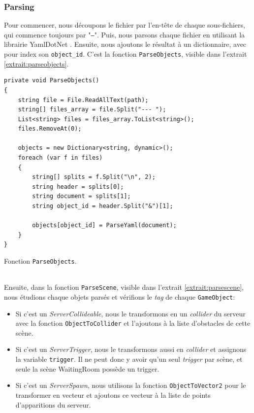 \documentclass[a4paper]{article}
\begin{document}
\subsubsection{Parsing}
Pour commencer, nous découpons le fichier par l'en-tête de chaque sous-fichiers, qui commence toujours par "\texttt{---}". Puis, nous parsons chaque fichier en utilisant la librairie YamlDotNet \cite{yamldotnet}. Ensuite, nous ajoutons le résultat à un dictionnaire, avec pour index son \texttt{object_id}. C'est la fonction \texttt{ParseObjects}, visible dans l'extrait \ref{extrait:parseobjects}. 
\begin{listing}[!ht]
\begin{verbatim}
private void ParseObjects()
{
    string file = File.ReadAllText(path);
    string[] files_array = file.Split("--- ");
    List<string> files = files_array.ToList<string>();
    files.RemoveAt(0);

    objects = new Dictionary<string, dynamic>();
    foreach (var f in files)
    {
        string[] splits = f.Split("\n", 2);
        string header = splits[0];
        string document = splits[1];
        string object_id = header.Split("&")[1];

        objects[object_id] = ParseYaml(document);
    }
}
\end{verbatim}
\caption{Fonction \texttt{ParseObjects}.}
\label{extrait:parseobjects}
\end{listing} \\
Ensuite, dans la fonction \texttt{ParseScene}, visible dans l'extrait \ref{extrait:parsescene}, nous étudions chaque objets parsés et vérifions le \textit{tag} de chaque \texttt{GameObject}:
\begin{itemize}
\item Si c'est un \textit{ServerCollideable}, nous le transformons en un \textit{collider} du serveur avec la fonction \texttt{ObjectToCollider} et l'ajoutons à la liste d'obstacles de cette scène.
\item Si c'est un \textit{ServerTrigger}, nous le transformons aussi en \textit{collider} et assignons la variable \texttt{trigger}. Il ne peut donc y avoir qu'un seul \textit{trigger} par scène, et seule la scène {WaitingRoom} possède un trigger.
\item Si c'est un \textit{ServerSpawn}, nous utilisons la fonction \texttt{ObjectToVector2} pour le transformer en vecteur et ajoutons ce vecteur à la liste de points d'apparitions du serveur. 
\end{itemize}
\end{document}
